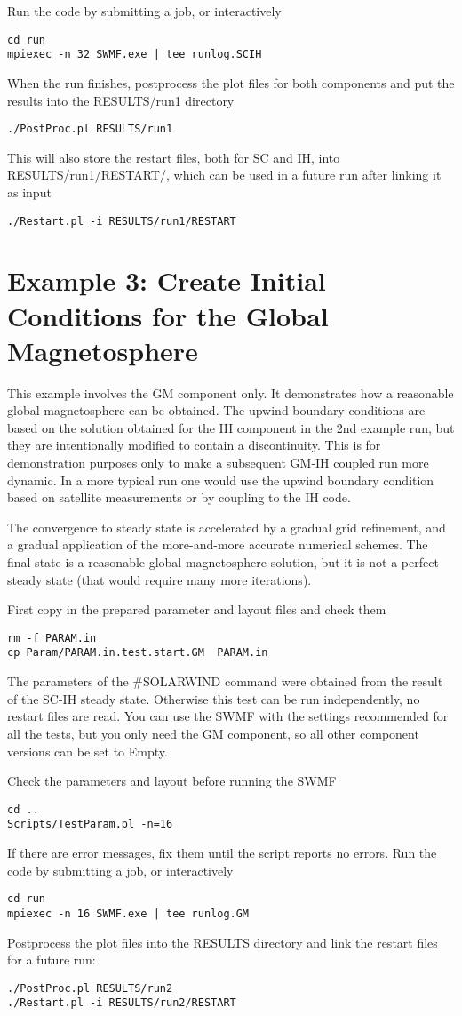 Run the code by submitting a job, or interactively
\begin{verbatim}
cd run
mpiexec -n 32 SWMF.exe | tee runlog.SCIH
\end{verbatim}
When the run finishes, postprocess the plot files for both components
and put the results into the RESULTS/run1 directory
\begin{verbatim}
./PostProc.pl RESULTS/run1
\end{verbatim}
This will also store the restart files, both for SC and IH, into
RESULTS/run1/RESTART/, which can be used in a future run after linking
it as input
\begin{verbatim}
./Restart.pl -i RESULTS/run1/RESTART
\end{verbatim}

\section{Example 3: Create Initial Conditions for the Global Magnetosphere}

This example involves the GM component only. It demonstrates
how a reasonable global magnetosphere can be obtained.
The upwind boundary conditions are based on the solution obtained
for the IH component in the 2nd example run, but they
are intentionally modified to contain a discontinuity.
This is for demonstration purposes only to make a subsequent
GM-IH coupled run more dynamic. In a more typical run one would
use the upwind boundary condition based on satellite measurements 
or by coupling to the IH code.

The convergence to steady state is accelerated by 
a gradual grid refinement, and a gradual application of the
more-and-more accurate numerical schemes. The final state
is a reasonable global magnetosphere solution, but it is not 
a perfect steady state (that would require many more iterations).

First copy in the prepared parameter and layout files and check them
\begin{verbatim}
rm -f PARAM.in
cp Param/PARAM.in.test.start.GM  PARAM.in
\end{verbatim}
The parameters of the \#SOLARWIND command were obtained
from the result of the SC-IH steady state. 
Otherwise this test can be run independently, 
no restart files are read.
You can use the SWMF with the settings recommended for all the tests, 
but you only need the GM component, so all other component versions 
can be set to Empty.

Check the parameters and layout before running the SWMF
\begin{verbatim}
cd ..
Scripts/TestParam.pl -n=16
\end{verbatim}
If there are error messages, fix them until the script reports no errors.
Run the code by submitting a job, or interactively
\begin{verbatim}
cd run
mpiexec -n 16 SWMF.exe | tee runlog.GM
\end{verbatim}
Postprocess the plot files into the RESULTS directory and link the restart files
for a future run:
\begin{verbatim}
./PostProc.pl RESULTS/run2
./Restart.pl -i RESULTS/run2/RESTART
\end{verbatim}

